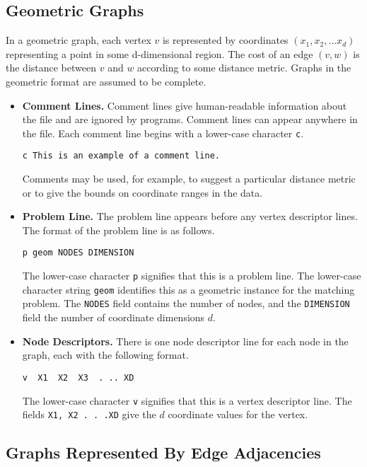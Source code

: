\subsection{Geometric Graphs} 
In a geometric graph, each vertex $v$ is represented by coordinates 
$(x_1, x_2, \ldots x_d)$ representing a point in some d-dimensional
region.  The cost of an edge $(v,w)$ is the distance between $v$ and
$w$ according to some distance metric.  Graphs in the geometric format are
assumed to be complete.  

\begin{itemize}
\item {\bf Comment Lines.} Comment lines give human-readable information
about the file and are ignored by programs. Comment lines 
can appear anywhere in the file. 
Each comment line begins with a lower-case character {\tt c}.  
\begin{verbatim}
c This is an example of a comment line. 
\end{verbatim} 
Comments may be used, for example, to suggest a particular distance metric
or to give the bounds on coordinate ranges in the data. 

\item {\bf Problem Line.} The problem line appears before any 
vertex descriptor lines.  The format of the problem line is as
follows.
\begin{verbatim}
p geom NODES DIMENSION
\end{verbatim}
The lower-case character {\tt p} signifies that this is a  problem line. 
The lower-case character string {\tt geom} identifies this as a
geometric instance for the matching problem. 
The {\tt NODES} field contains the number of nodes, and the
{\tt DIMENSION} field the number of coordinate dimensions $d$.  

\item {\bf Node Descriptors.} There is one node descriptor
line for each node in  the graph, each with the following format. 
\begin{verbatim}
v  X1  X2  X3  . .. XD
\end{verbatim} 
The lower-case character {\tt v} signifies that this is a vertex 
descriptor line.  The fields {\tt X1, X2 . . .XD} give the $d$
coordinate values for the vertex.  
\end{itemize} 

\subsection{Graphs Represented By Edge Adjacencies}

